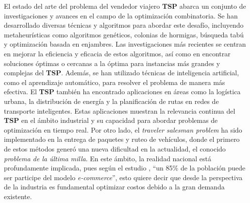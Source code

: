             El estado del arte del problema del vendedor viajero \textbf{TSP} abarca un conjunto de investigaciones y avances en el campo de la optimización combinatoria. Se han desarrollado diversas técnicas y algoritmos para abordar este desafío, incluyendo metaheurísticas como algoritmos genéticos, colonias de hormigas, búsqueda tabú y optimización basada en enjambres.
            \newline
            \newline
            Las investigaciones más recientes se centran en mejorar la eficiencia y eficacia de estos algoritmos, así como en encontrar soluciones óptimas o cercanas a la óptima para instancias más grandes y complejas del \textbf{TSP}. Además, se han utilizado técnicas de inteligencia artificial, como el aprendizaje automático, para resolver el problema de manera más efectiva.
            \newline
            \newline
            El \textbf{TSP} también ha encontrado aplicaciones en áreas como la logística urbana, la distribución de energía y la planificación de rutas en redes de transporte inteligentes. Estas aplicaciones muestran la relevancia continua del \textbf{TSP} en el ámbito industrial y su capacidad para abordar problemas de optimización en tiempo real.
            \newline
            \newline
            Por otro lado, el \textit{traveler salesman problem} ha sido implementado en la entrega de paquetes y ruteo de vehículos, donde el primero de estos métodos generó una nueva dificultad en la actualidad, el conocido \textit{problema de la última milla}. En este ámbito, la realidad nacional está profundamente implicada, pues según el estudio \parencite[19]{ULTIMAMILLACHILE}, ``un 85\% de la población puede ser participe del modelo \textit{e-commerce}'', esto quiere decir que desde la perspectiva de la industria es fundamental optimizar costos debido a la gran demanda existente.
            
